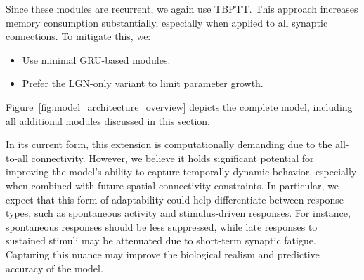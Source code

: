 Since these modules are recurrent, we again use TBPTT. This approach increases memory consumption substantially, especially when applied to all synaptic connections. To mitigate this, we:
\begin{itemize}
    \item Use minimal GRU-based modules.
    \item Prefer the LGN-only variant to limit parameter growth.
\end{itemize}

Figure~\ref{fig:model_architecture_overview} depicts the complete model, including all additional modules discussed in this section.

In its current form, this extension is computationally demanding due to the all-to-all connectivity. However, we believe it holds significant potential for improving the model's ability to capture temporally dynamic behavior, especially when combined with future spatial connectivity constraints. In particular, we expect that this form of adaptability could help differentiate between response types, such as spontaneous activity and stimulus-driven responses. For instance, spontaneous responses should be less suppressed, while late responses to sustained stimuli may be attenuated due to short-term synaptic fatigue. Capturing this nuance may improve the biological realism and predictive accuracy of the model.

